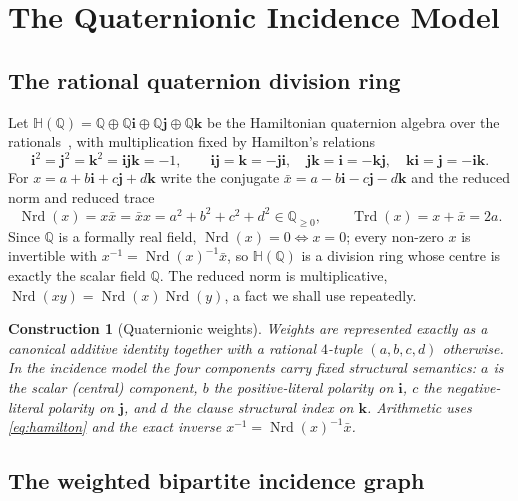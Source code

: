 \documentclass[pdflatex,sn-mathphys-num]{sn-jnl}
\theoremstyle{thmstyleone}%
\newtheorem{construction}[theorem]{Construction}%
\theoremstyle{thmstyletwo}%
\theoremstyle{thmstylethree}%
\newcommand{\HH}{\mathbb{H}}
\newcommand{\QQ}{\mathbb{Q}}
\newcommand{\Nrd}{\operatorname{Nrd}}
\newcommand{\Trd}{\operatorname{Trd}}
\newcommand{\bi}{\mathbf{i}}
\newcommand{\bj}{\mathbf{j}}
\newcommand{\bk}{\mathbf{k}}
\begin{document}
\newpage

\section{The Quaternionic Incidence Model}\label{sec:incidence}

\subsection{The rational quaternion division ring}

Let $\HH(\QQ)=\QQ\oplus\QQ\bi\oplus\QQ\bj\oplus\QQ\bk$ be the Hamiltonian
quaternion algebra over the rationals~\cite{Voight,Lam}, with multiplication
fixed by Hamilton's relations
\begin{equation}\label{eq:hamilton}
  \bi^{2}=\bj^{2}=\bk^{2}=\bi\bj\bk=-1,\qquad
  \bi\bj=\bk=-\bj\bi,\quad \bj\bk=\bi=-\bk\bj,\quad \bk\bi=\bj=-\bi\bk.
\end{equation}
For $x=a+b\bi+c\bj+d\bk$ write the conjugate $\bar x=a-b\bi-c\bj-d\bk$ and
the reduced norm and reduced trace
\begin{equation}\label{eq:normtrace}
  \Nrd(x)=x\bar x=\bar x x=a^{2}+b^{2}+c^{2}+d^{2}\in\QQ_{\ge0},
  \qquad \Trd(x)=x+\bar x=2a.
\end{equation}
Since $\QQ$ is a formally real field, $\Nrd(x)=0\iff x=0$; every non-zero
$x$ is invertible with $x^{-1}=\Nrd(x)^{-1}\bar x$, so $\HH(\QQ)$ is a
division ring whose centre is exactly the scalar field $\QQ$. The reduced
norm is multiplicative, $\Nrd(xy)=\Nrd(x)\Nrd(y)$, a fact we shall use
repeatedly.

\begin{construction}[Quaternionic weights]\label{con:weights}
Weights are represented exactly as a canonical additive identity together
with a rational $4$-tuple $(a,b,c,d)$ otherwise. In the incidence model the
four components carry fixed structural semantics: $a$ is the scalar
(central) component, $b$ the positive-literal polarity on $\bi$, $c$ the
negative-literal polarity on $\bj$, and $d$ the clause structural index on
$\bk$. Arithmetic uses \eqref{eq:hamilton} and the exact inverse
$x^{-1}=\Nrd(x)^{-1}\bar x$.
\end{construction}

\subsection{The weighted bipartite incidence graph}
\end{document}

